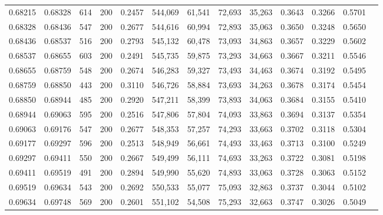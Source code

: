 \begin{tabular}{rrrrrrrrrrrrr}
0.68215 & 0.68328 &   614 & 200 &                                     0.2457 & 544,069 &  61,541 &  72,693 &  35,263 & 0.3643 & 0.3266 & 0.5701 \\
0.68328 & 0.68436 &   547 & 200 &                                     0.2677 & 544,616 &  60,994 &  72,893 &  35,063 & 0.3650 & 0.3248 & 0.5650 \\
0.68436 & 0.68537 &   516 & 200 &                                     0.2793 & 545,132 &  60,478 &  73,093 &  34,863 & 0.3657 & 0.3229 & 0.5602 \\
0.68537 & 0.68655 &   603 & 200 &                                     0.2491 & 545,735 &  59,875 &  73,293 &  34,663 & 0.3667 & 0.3211 & 0.5546 \\
0.68655 & 0.68759 &   548 & 200 &                                     0.2674 & 546,283 &  59,327 &  73,493 &  34,463 & 0.3674 & 0.3192 & 0.5495 \\
0.68759 & 0.68850 &   443 & 200 &                                     0.3110 & 546,726 &  58,884 &  73,693 &  34,263 & 0.3678 & 0.3174 & 0.5454 \\
0.68850 & 0.68944 &   485 & 200 &                                     0.2920 & 547,211 &  58,399 &  73,893 &  34,063 & 0.3684 & 0.3155 & 0.5410 \\
0.68944 & 0.69063 &   595 & 200 &                                     0.2516 & 547,806 &  57,804 &  74,093 &  33,863 & 0.3694 & 0.3137 & 0.5354 \\
0.69063 & 0.69176 &   547 & 200 &                                     0.2677 & 548,353 &  57,257 &  74,293 &  33,663 & 0.3702 & 0.3118 & 0.5304 \\
0.69177 & 0.69297 &   596 & 200 &                                     0.2513 & 548,949 &  56,661 &  74,493 &  33,463 & 0.3713 & 0.3100 & 0.5249 \\
0.69297 & 0.69411 &   550 & 200 &                                     0.2667 & 549,499 &  56,111 &  74,693 &  33,263 & 0.3722 & 0.3081 & 0.5198 \\
0.69411 & 0.69519 &   491 & 200 &                                     0.2894 & 549,990 &  55,620 &  74,893 &  33,063 & 0.3728 & 0.3063 & 0.5152 \\
0.69519 & 0.69634 &   543 & 200 &                                     0.2692 & 550,533 &  55,077 &  75,093 &  32,863 & 0.3737 & 0.3044 & 0.5102 \\
0.69634 & 0.69748 &   569 & 200 &                                     0.2601 & 551,102 &  54,508 &  75,293 &  32,663 & 0.3747 & 0.3026 & 0.5049 \\

\end{tabular}
